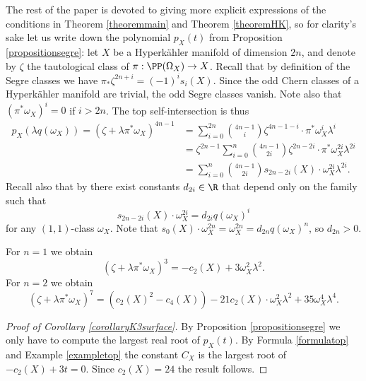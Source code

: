 \begin{remark}
The rest of the paper is devoted to giving more explicit expressions of the conditions
in Theorem \ref{theoremmain} and Theorem \ref{theoremHK}, so for clarity's sake let us write down the polynomial
$p_X(t)$ from Proposition \ref{propositionsegre}:
let $X$ be a Hyperkähler manifold of dimension $2n$, and denote by $\zeta$ the tautological class of $\pi: \PP(\Omega_X)\to X$.
Recall that by definition of the Segre classes we have $\pi_* \zeta^{2n+i}=(-1)^i s_i(X)$.
Since the odd Chern classes of a Hyperkähler manifold are trivial,
the odd Segre classes vanish. Note also that $(\pi^*\omega_X)^i=0$ if $i > 2n$.
The top self-intersection is thus
\begin{equation}\label{formulatop}
\begin{split}
p_X(\lambda q(\omega_X))= (\zeta+\lambda \pi^*\omega_X)^{4n-1}&=\sum_{i=0}^{2n} \binom{4n-1}{i}\zeta^{4n-1-i} \cdot \pi^*\omega_X^{i} \lambda^i
\\ &= \zeta^{2n-1}\sum_{i=0}^{n} \binom{4n-1}{2i} \zeta^{2n-2i} \cdot \pi^* \omega_X^{2i} \lambda^{2i}
\\ &=\sum_{i=0}^{n} \binom{4n-1}{2i} s_{2n-2i}(X) \cdot \omega_X^{2i} \lambda^{2i}.
\end{split}
\end{equation}
Recall also
that by \cite[Rem.\,4.12]{F87}
there exist constants $d_{2i} \in \R$
that depend only on the family such that
\begin{equation}\label{intersectionsegre}
s_{2n-2i}(X) \cdot \omega_X^{2i}= d_{2i} q(\omega_X)^{i}
\end{equation}
for any $(1,1)$-class $\omega_X$. Note that $s_{0}(X) \cdot \omega_X^{2n}= \omega_X^{2n} = d_{2n} q(\omega_X)^{n}$, so $d_{2n}>0$.
\end{remark}

\begin{example} \label{exampletop}
For $n=1$ we obtain
\[
(\zeta+\lambda \pi^*\omega_X)^{3} = - c_2(X)+3 \omega_X^2 \lambda^2.
\]
For $n=2$ we obtain
\[
(\zeta+ \lambda\pi^* \omega_X)^7
=(c_2(X)^2-c_4(X))-21 c_2(X) \cdot \omega_X^2 \lambda^2+ 35 \omega_X^4 \lambda^4.
\]
\end{example}

\begin{proof}[Proof of Corollary \ref{corollaryK3surface}]
By Proposition \ref{propositionsegre} we only have to compute the
largest real root of $p_X(t)$.
By Formula \eqref{formulatop} and
Example \ref{exampletop} the constant $C_X$ is the largest root of $-c_2(X)+3 t=0$. Since $c_2(X)=24$ the result follows.
\end{proof}


